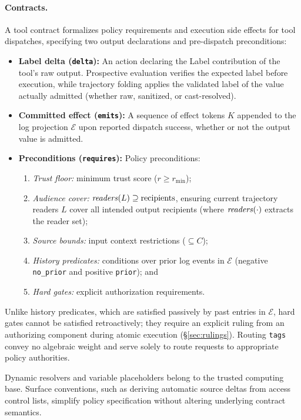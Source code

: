 \paragraph{Contracts.}
A tool contract formalizes policy requirements and execution side effects for tool dispatches, specifying two output declarations and pre-dispatch preconditions:
\begin{itemize}
  \item \textbf{Label delta (\texttt{delta}):} An action declaring the Label contribution of the tool's raw output. Prospective evaluation verifies the expected label before execution, while trajectory folding applies the validated label of the value actually admitted (whether raw, sanitized, or cast-resolved).
  \item \textbf{Committed effect (\texttt{emits}):} A sequence of effect tokens $K$ appended to the log projection $\mathcal{E}$ upon reported dispatch success, whether or not the output value is admitted.
  \item \textbf{Preconditions (\texttt{requires}):} Policy preconditions:
  \begin{enumerate}
    \item \emph{Trust floor:} minimum trust score ($r \ge r_{\min}$);
    \item \emph{Audience cover:} $\mathit{readers}(L) \supseteq \mathrm{recipients}$, ensuring current trajectory readers $L$ cover all intended output recipients (where $\mathit{readers}(\cdot)$ extracts the reader set);
    \item \emph{Source bounds:} input context restrictions ($\subseteq C$);
    \item \emph{History predicates:} conditions over prior log events in $\mathcal{E}$ (negative \texttt{no\_prior} and positive \texttt{prior}); and
    \item \emph{Hard gates:} explicit authorization requirements.
  \end{enumerate}
\end{itemize}
Unlike history predicates, which are satisfied passively by past entries in $\mathcal{E}$, hard gates cannot be satisfied retroactively; they require an explicit ruling from an authorizing component during atomic execution (\S\ref{sec:rulings}). Routing \texttt{tags} convey no algebraic weight and serve solely to route requests to appropriate policy authorities.

Dynamic resolvers and variable placeholders belong to the trusted computing base. Surface conventions, such as deriving automatic source deltas from access control lists, simplify policy specification without altering underlying contract semantics.

